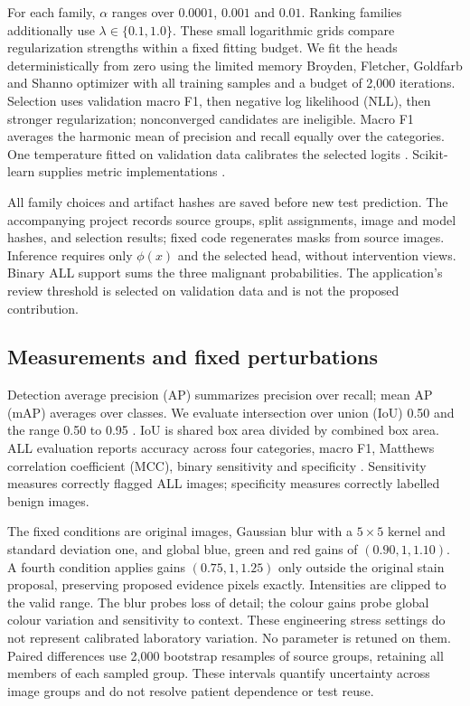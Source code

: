 \documentclass[conference,letterpaper]{IEEEtran}
\begin{document}
For each family, $\alpha$ ranges over $0.0001$, $0.001$ and $0.01$. Ranking families additionally use $\lambda\in\{0.1,1.0\}$. These small logarithmic grids compare regularization strengths within a fixed fitting budget. We fit the heads deterministically from zero using the limited memory Broyden, Fletcher, Goldfarb and Shanno optimizer with all training samples and a budget of 2,000 iterations. Selection uses validation macro F1, then negative log likelihood (NLL), then stronger regularization; nonconverged candidates are ineligible. Macro F1 averages the harmonic mean of precision and recall equally over the categories. One temperature fitted on validation data calibrates the selected logits \cite{guo}. Scikit-learn supplies metric implementations \cite{sklearn}.

All family choices and artifact hashes are saved before new test prediction. The accompanying project records source groups, split assignments, image and model hashes, and selection results; fixed code regenerates masks from source images. Inference requires only $\phi(x)$ and the selected head, without intervention views. Binary ALL support sums the three malignant probabilities. The application's review threshold is selected on validation data and is not the proposed contribution.

\subsection{Measurements and fixed perturbations}
Detection average precision (AP) summarizes precision over recall; mean AP (mAP) averages over classes. We evaluate intersection over union (IoU) 0.50 and the range 0.50 to 0.95 \cite{voc,coco}. IoU is shared box area divided by combined box area. ALL evaluation reports accuracy across four categories, macro F1, Matthews correlation coefficient (MCC), binary sensitivity and specificity \cite{gorodkin,chicco}. Sensitivity measures correctly flagged ALL images; specificity measures correctly labelled benign images.

The fixed conditions are original images, Gaussian blur with a $5\times5$ kernel and standard deviation one, and global blue, green and red gains of $(0.90,1,1.10)$. A fourth condition applies gains $(0.75,1,1.25)$ only outside the original stain proposal, preserving proposed evidence pixels exactly. Intensities are clipped to the valid range. The blur probes loss of detail; the colour gains probe global colour variation and sensitivity to context. These engineering stress settings do not represent calibrated laboratory variation. No parameter is retuned on them. Paired differences use 2,000 bootstrap resamples of source groups, retaining all members of each sampled group. These intervals quantify uncertainty across image groups and do not resolve patient dependence or test reuse.
\end{document}
